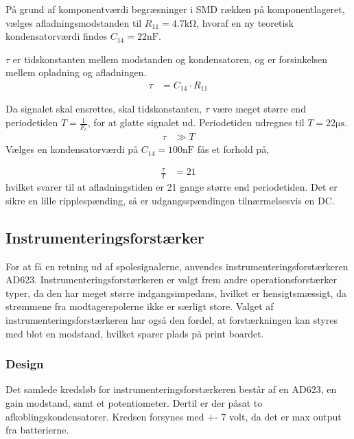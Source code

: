 	
På grund af komponentværdi begræsninger i SMD rækken på komponentlageret, vælges afladningsmodstanden til $R_{11} = 4.7 \si{\kilo\ohm}$, hvoraf en ny teoretisk kondensatorværdi findes $C_{14} = 22 \si{\nano\farad}$.


$\tau$ er tidskonstanten mellem modstanden og kondensatoren, og er forsinkelsen mellem opladning og afladningen. 
\begin{align}
		\tau & = C_{14} \cdot R_{11}
\end{align}

Da signalet skal ensrettes, skal tidskonstanten, $\tau$ være meget større end periodetiden $T = \frac{1}{F_c}$, for at glatte signalet ud. Periodetiden udregnes til $T = 22 \si{\micro\second}$.
\begin{align}
		\tau & \gg T \nonumber
\end{align}
Vælges en kondensatorværdi på $C_{14} = 100 \si{\nano\farad}$ fås et forhold på,

\begin{align}
	\frac{\tau}{T} & = 21
\end{align}
hvilket svarer til at afladningstiden er 21 gange større end periodetiden. Det er sikre en lille ripplespænding, så er udgangsspændingen tilnærmelsesvis en DC.

\subsection{Instrumenteringsforstærker}
For at få en retning ud af spolesignalerne, anvendes instrumenteringsforstærkeren AD623. Instrumenteringsforstærkeren er valgt frem andre operationsforstærker typer, da den har meget større indgangsimpedans, hvilket er hensigtsmæssigt, da strømmene fra modtagerspolerne ikke er særligt store. Valget af instrumenteringsforstærkeren har også den fordel, at forstærkningen kan styres med blot en modstand, hvilket sparer plads på print boardet.


\subsubsection{Design}
Det samlede kredsløb for instrumenteringsforstærkeren består af en AD623, en gain modstand, samt et potentiometer. Dertil er der påsat to afkoblingskondensatorer. Kredsen forsynes med +- 7 volt, da det er max output fra batterierne. 


